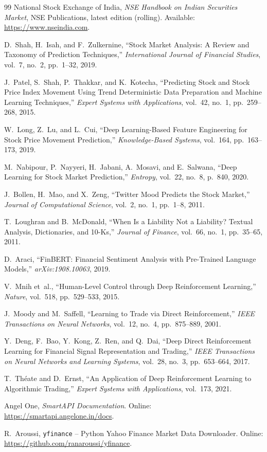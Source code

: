 \begin{thebibliography}{99}
National Stock Exchange of India, \textit{NSE Handbook on Indian Securities Market}, NSE Publications, latest edition (rolling). Available: \url{https://www.nseindia.com}.

D.~Shah, H.~Isah, and F.~Zulkernine, ``Stock Market Analysis: A Review and Taxonomy of Prediction Techniques,'' \textit{International Journal of Financial Studies}, vol.~7, no.~2, pp.~1--32, 2019.

J.~Patel, S.~Shah, P.~Thakkar, and K.~Kotecha, ``Predicting Stock and Stock Price Index Movement Using Trend Deterministic Data Preparation and Machine Learning Techniques,'' \textit{Expert Systems with Applications}, vol.~42, no.~1, pp.~259--268, 2015.

W.~Long, Z.~Lu, and L.~Cui, ``Deep Learning-Based Feature Engineering for Stock Price Movement Prediction,'' \textit{Knowledge-Based Systems}, vol.~164, pp.~163--173, 2019.

M.~Nabipour, P.~Nayyeri, H.~Jabani, A.~Mosavi, and E.~Salwana, ``Deep Learning for Stock Market Prediction,'' \textit{Entropy}, vol.~22, no.~8, p.~840, 2020.

J.~Bollen, H.~Mao, and X.~Zeng, ``Twitter Mood Predicts the Stock Market,'' \textit{Journal of Computational Science}, vol.~2, no.~1, pp.~1--8, 2011.

T.~Loughran and B.~McDonald, ``When Is a Liability Not a Liability? Textual Analysis, Dictionaries, and 10-Ks,'' \textit{Journal of Finance}, vol.~66, no.~1, pp.~35--65, 2011.

D.~Araci, ``FinBERT: Financial Sentiment Analysis with Pre-Trained Language Models,'' \textit{arXiv:1908.10063}, 2019.

V.~Mnih et~al., ``Human-Level Control through Deep Reinforcement Learning,'' \textit{Nature}, vol.~518, pp.~529--533, 2015.

J.~Moody and M.~Saffell, ``Learning to Trade via Direct Reinforcement,'' \textit{IEEE Transactions on Neural Networks}, vol.~12, no.~4, pp.~875--889, 2001.

Y.~Deng, F.~Bao, Y.~Kong, Z.~Ren, and Q.~Dai, ``Deep Direct Reinforcement Learning for Financial Signal Representation and Trading,'' \textit{IEEE Transactions on Neural Networks and Learning Systems}, vol.~28, no.~3, pp.~653--664, 2017.

T.~Th\'eate and D.~Ernst, ``An Application of Deep Reinforcement Learning to Algorithmic Trading,'' \textit{Expert Systems with Applications}, vol.~173, 2021.

Angel One, \textit{SmartAPI Documentation}. Online: \url{https://smartapi.angelone.in/docs}.

R.~Aroussi, \texttt{yfinance} -- Python Yahoo Finance Market Data Downloader. Online: \url{https://github.com/ranaroussi/yfinance}.

\end{thebibliography}
